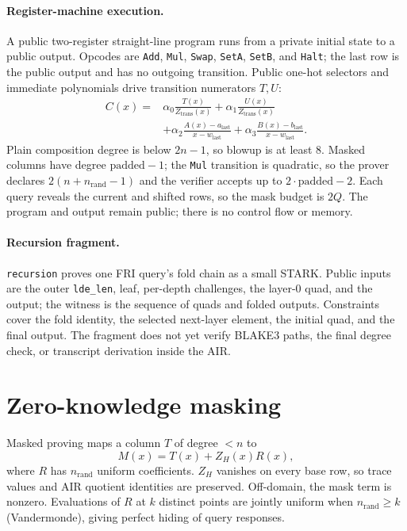 \documentclass[11pt,a4paper]{article}
\begin{document}
\paragraph{Register-machine execution.} A public two-register straight-line
program runs from a private initial state to a public output. Opcodes are
\texttt{Add}, \texttt{Mul}, \texttt{Swap}, \texttt{SetA}, \texttt{SetB}, and
\texttt{Halt}; the last row is the public output and has no outgoing
transition. Public one-hot selectors and immediate polynomials drive
transition numerators $T,U$:
\[
\begin{aligned}
C(x)={}&\alpha_0\frac{T(x)}{Z_{\mathrm{trans}}(x)}
+\alpha_1\frac{U(x)}{Z_{\mathrm{trans}}(x)}\\
&+\alpha_2\frac{A(x)-a_{\mathrm{last}}}{x-w_{\mathrm{last}}}
+\alpha_3\frac{B(x)-b_{\mathrm{last}}}{x-w_{\mathrm{last}}}.
\end{aligned}
\]
Plain composition degree is below $2n-1$, so blowup is at least 8. Masked
columns have degree $\mathrm{padded}-1$; the \texttt{Mul} transition is
quadratic, so the prover declares $2(n+n_{\mathrm{rand}}-1)$ and the verifier
accepts up to $2\cdot\mathrm{padded}-2$. Each query reveals the current and
shifted rows, so the mask budget is $2Q$. The program and output remain
public; there is no control flow or memory.

\paragraph{Recursion fragment.} \texttt{recursion} proves one FRI query's fold
chain as a small STARK. Public inputs are the outer \texttt{lde\_len}, leaf,
per-depth challenges, the layer-0 quad, and the output; the witness is the
sequence of quads and folded outputs. Constraints cover the fold identity,
the selected next-layer element, the initial quad, and the final output. The
fragment does not yet verify BLAKE3 paths, the final degree check, or
transcript derivation inside the AIR.

\section{Zero-knowledge masking}

Masked proving maps a column $T$ of degree $<n$ to
\[
M(x)=T(x)+Z_H(x)R(x),
\]
where $R$ has $n_{\mathrm{rand}}$ uniform coefficients. $Z_H$ vanishes on
every base row, so trace values and AIR quotient identities are preserved.
Off-domain, the mask term is nonzero. Evaluations of $R$ at $k$ distinct
points are jointly uniform when $n_{\mathrm{rand}}\ge k$ (Vandermonde),
giving perfect hiding of query responses.
\end{document}
